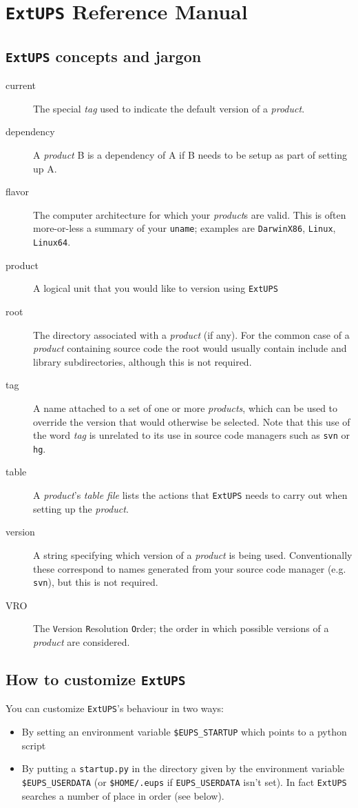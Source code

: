 \documentclass{article}
\newcommand{\code}[1]{\texttt{#1}}
\newcommand{\file}[1]{\texttt{#1}}
\newcommand{\eups}{\code{ExtUPS}\xspace}
\begin{document}
\section{\eups Reference Manual}

\subsection{\eups concepts and jargon}

\begin{description}
\item[current]
  The special \textit{tag} used to indicate the default version of a \textit{product}.
\item[dependency]
  A \textit{product} B is a dependency of A if B needs to be setup as part of setting up A.
\item[flavor]
  The computer architecture for which your \textit{product}s are valid.  This is often more-or-less
  a summary of your \code{uname}; examples are \code{DarwinX86}, \code{Linux}, \code{Linux64}.
\item[product]
  A logical unit that you would like to version using \eups
\item[root]
  The directory associated with a \textit{product} (if any).  For the common case of
  a \textit{product} containing source code the root would usually contain include and library subdirectories,
  although this is not required.
\item[tag]
  A name attached to a set of one or more \textit{products}, which can be used to override the version
  that would otherwise be selected.  Note that this use of the word \textit{tag} is unrelated to its use
  in source code managers such as \code{svn} or \code{hg}.
\item[table]
  A \textit{product}'s \textit{table file} lists the actions that \eups
  needs to carry out when setting up the \textit{product}.
\item[version]
  A string specifying which version of a \textit{product} is being used.  Conventionally these correspond to names
  generated from your source code manager (e.g. \code{svn}), but this is not required.
\item[VRO]
  The \code{V}ersion \code{R}esolution \code{O}rder;  the order in which possible versions of
  a \textit{product} are considered.
\end{description}

\subsection{How to customize \eups}
\label{customization}
You can customize \eups's behaviour in two ways:
\begin{itemize}
\item By setting an environment variable \code{\$EUPS\_STARTUP} which points to a python script
\item By putting a \file{startup.py} in the directory given by the  environment variable
  \code{\$EUPS\_USERDATA} (or \file{\$HOME/.eups} if \code{EUPS\_USERDATA} isn't set).
  In fact \eups searches a number of place in order (see below).
\end{itemize}
\end{document}
